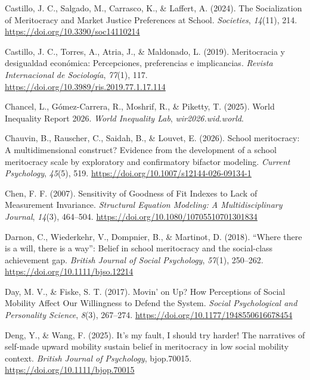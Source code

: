 \documentclass[
  13pt,
]{article}
\newlength{\cslhangindent}
\newenvironment{CSLReferences}[2] %
 {\begin{list}{}{%
  \setlength{\itemindent}{0pt}
  \setlength{\leftmargin}{0pt}
  \setlength{\parsep}{0pt}
  \ifodd #1
   \setlength{\leftmargin}{\cslhangindent}
   \setlength{\itemindent}{-1\cslhangindent}
  \fi
  \setlength{\itemsep}{#2\baselineskip}}}
 {\end{list}}
\begin{document}
\begin{CSLReferences}{1}{0}
Castillo, J. C., Salgado, M., Carrasco, K., \& Laffert, A. (2024). The
{Socialization} of {Meritocracy} and {Market Justice Preferences} at
{School}. \emph{Societies}, \emph{14}(11), 214.
\url{https://doi.org/10.3390/soc14110214}

Castillo, J. C., Torres, A., Atria, J., \& Maldonado, L. (2019).
Meritocracia y desigualdad económica: {Percepciones}, preferencias e
implicancias. \emph{Revista Internacional de Sociología}, \emph{77}(1),
117. \url{https://doi.org/10.3989/ris.2019.77.1.17.114}

Chancel, L., Gómez-Carrera, R., Moshrif, R., \& Piketty, T. (2025).
World {Inequality Report} 2026. \emph{World Inequality Lab},
\emph{wir2026.wid.world}.

Chauvin, B., Rauscher, C., Saidah, B., \& Louvet, E. (2026). School
meritocracy: A multidimensional construct? {Evidence} from the
development of a school meritocracy scale by exploratory and
confirmatory bifactor modeling. \emph{Current Psychology}, \emph{45}(5),
519. \url{https://doi.org/10.1007/s12144-026-09134-1}

Chen, F. F. (2007). Sensitivity of {Goodness} of {Fit Indexes} to {Lack}
of {Measurement Invariance}. \emph{Structural Equation Modeling: A
Multidisciplinary Journal}, \emph{14}(3), 464--504.
\url{https://doi.org/10.1080/10705510701301834}

Darnon, C., Wiederkehr, V., Dompnier, B., \& Martinot, D. (2018).
{``{Where} there is a will, there is a way''}: {Belief} in school
meritocracy and the social-class achievement gap. \emph{British Journal
of Social Psychology}, \emph{57}(1), 250--262.
\url{https://doi.org/10.1111/bjso.12214}

Day, M. V., \& Fiske, S. T. (2017). Movin' on {Up}? {How Perceptions} of
{Social Mobility Affect Our Willingness} to {Defend} the {System}.
\emph{Social Psychological and Personality Science}, \emph{8}(3),
267--274. \url{https://doi.org/10.1177/1948550616678454}

Deng, Y., \& Wang, F. (2025). It's my fault, {I} should try harder!
{The} narratives of self-made upward mobility sustain belief in
meritocracy in low social mobility context. \emph{British Journal of
Psychology}, bjop.70015. \url{https://doi.org/10.1111/bjop.70015}


\end{CSLReferences}
\end{document}
